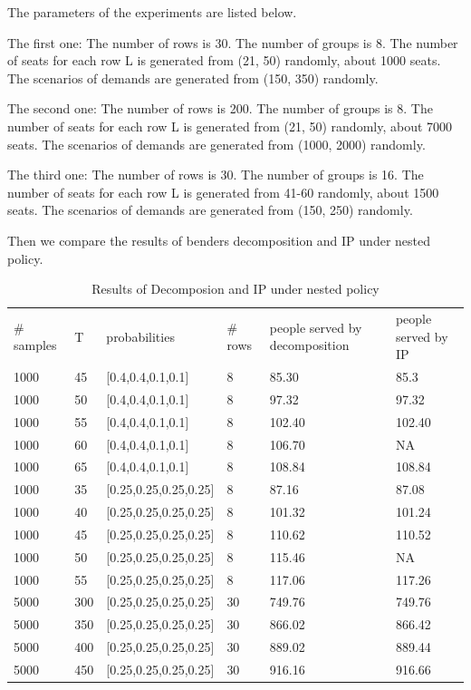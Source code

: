 The parameters of the experiments are listed below.

The first one:
The number of rows is 30.
The number of groups is 8.
The number of seats for each row L is generated from (21, 50) randomly, about 1000 seats.
The scenarios of demands are generated from (150, 350) randomly.

The second one:
The number of rows is 200.
The number of groups is 8.
The number of seats for each row L is generated from (21, 50) randomly, about 7000 seats.
The scenarios of demands are generated from (1000, 2000) randomly.

The third one:
The number of rows is 30.
The number of groups is 16.
The number of seats for each row L is generated from 41-60 randomly, about 1500 seats.
The scenarios of demands are generated from (150, 250) randomly.

Then we compare the results of benders decomposition and IP under nested policy.

\begin{table}[ht]
    \caption{Results of Decomposion and IP under nested policy}
    \begin{tabular}{l|l|l|l|l|l}
    \hline
    \# samples & T & probabilities & \# rows & people served by decomposition & people served by IP \\
    1000  & 45  & [0.4,0.4,0.1,0.1] & 8 & 85.30 & 85.3 \\
    1000  & 50  & [0.4,0.4,0.1,0.1] & 8 & 97.32 & 97.32 \\
    1000  & 55  & [0.4,0.4,0.1,0.1] & 8 & 102.40 & 102.40  \\ %
    1000  & 60  & [0.4,0.4,0.1,0.1] & 8 & 106.70 & NA  \\
    1000  & 65  & [0.4,0.4,0.1,0.1] & 8 & 108.84 & 108.84 \\
    \hline
    1000  & 35  & [0.25,0.25,0.25,0.25] & 8 & 87.16 & 87.08 \\
    1000  & 40  & [0.25,0.25,0.25,0.25] & 8 & 101.32 & 101.24 \\
    1000  & 45  & [0.25,0.25,0.25,0.25] & 8 & 110.62 & 110.52 \\
    1000  & 50  & [0.25,0.25,0.25,0.25] & 8 & 115.46 & NA \\
    1000  & 55  & [0.25,0.25,0.25,0.25] & 8 & 117.06 & 117.26 \\
    \hline
    5000  & 300  & [0.25,0.25,0.25,0.25] & 30 & 749.76 & 749.76 \\
    5000  & 350  & [0.25,0.25,0.25,0.25] & 30 & 866.02 & 866.42 \\
    5000  & 400  & [0.25,0.25,0.25,0.25] & 30 & 889.02 & 889.44 \\
    5000  & 450  & [0.25,0.25,0.25,0.25] & 30 & 916.16 & 916.66 \\
    \hline
    \end{tabular}
\end{table}

